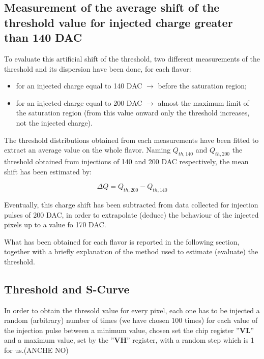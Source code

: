\subsection{Measurement of the average shift of the threshold value for injected charge greater than 140 DAC}

To evaluate this artificial shift of the threshold, two different measurements of the threshold and its dispersion have been done, for each flavor:

\begin{itemize}
\item for an injected charge equal to 140 DAC $\rightarrow$ before the saturation region;
\item for an injected charge equal to 200 DAC $\rightarrow$ almost the maximum limit of the saturation region (from this value onward only the threshold increases, not the injected charge).
\end{itemize}

The threshold distributions obtained from each measurements have been fitted to extract an average value on the whole flavor. Naming $Q_{th, 140}$ and $Q_{th, 200}$  the threshold obtained from injections of 140 and 200 DAC respectively, the mean shift has been estimated by:

\begin{equation}
\Delta Q = Q_{th,200} - Q_{th,140}
\end{equation}

Eventually, this charge shift has been subtracted from data collected for injection pulses of 200 DAC, in order to extrapolate (deduce) the behaviour of the injected pixels up to a value fo 170 DAC.

What has been obtained for each flavor is reported in the following section, together with a briefly explanation of the method used to estimate (evaluate) the threshold.


\subsection{Threshold and S-Curve}

In order to obtain the thresold value for every pixel, each one has to be injected a random (arbitrary) number of times (we have chosen 100 times) for each value of the injection pulse between a minimum value, chosen set the chip register ''\textbf{VL}'' and a maximum value, set by the ''\textbf{VH}'' register, with a random step which is 1 for us.(ANCHE NO)


